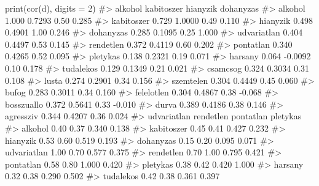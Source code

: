 \documentclass[
  letterpaper,
]{krantz}
\makeatletter
\newenvironment{Shaded}{\begin{snugshade}}{\end{snugshade}}
\newcommand{\AttributeTok}[1]{\textcolor[rgb]{0.40,0.45,0.13}{#1}}
\newcommand{\CommentTok}[1]{\textcolor[rgb]{0.37,0.37,0.37}{#1}}
\newcommand{\DecValTok}[1]{\textcolor[rgb]{0.68,0.00,0.00}{#1}}
\newcommand{\FunctionTok}[1]{\textcolor[rgb]{0.28,0.35,0.67}{#1}}
\newcommand{\NormalTok}[1]{\textcolor[rgb]{0.00,0.23,0.31}{#1}}
\newenvironment{kframe}{%
\medskip{}
\setlength{\fboxsep}{.8em}
 \def\at@end@of@kframe{}%
 \ifinner\ifhmode%
  \def\at@end@of@kframe{\end{minipage}}%
  \begin{minipage}{\columnwidth}%
 \fi\fi%
 \def\FrameCommand##1{\hskip\@totalleftmargin \hskip-\fboxsep
 \colorbox{shadecolor}{##1}\hskip-\fboxsep
     \hskip-\linewidth \hskip-\@totalleftmargin \hskip\columnwidth}%
 \MakeFramed {\advance\hsize-\width
   \@totalleftmargin\z@ \linewidth\hsize
   \@setminipage}}%
 {\par\unskip\endMakeFramed%
 \at@end@of@kframe}
\renewenvironment{Shaded}{\begin{kframe}}{\end{kframe}}
\makeatother
\begin{document}
\begin{Shaded}
\begin{Highlighting}[]
\FunctionTok{print}\NormalTok{(}\FunctionTok{cor}\NormalTok{(d), }\AttributeTok{digits =} \DecValTok{2}\NormalTok{)}
\CommentTok{\#\textgreater{}             alkohol kabitoszer hianyzik dohanyzas}
\CommentTok{\#\textgreater{} alkohol       1.000     0.7293     0.50     0.285}
\CommentTok{\#\textgreater{} kabitoszer    0.729     1.0000     0.49     0.110}
\CommentTok{\#\textgreater{} hianyzik      0.498     0.4901     1.00     0.246}
\CommentTok{\#\textgreater{} dohanyzas     0.285     0.1095     0.25     1.000}
\CommentTok{\#\textgreater{} udvariatlan   0.404     0.4497     0.53     0.145}
\CommentTok{\#\textgreater{} rendetlen     0.372     0.4119     0.60     0.202}
\CommentTok{\#\textgreater{} pontatlan     0.340     0.4265     0.52     0.095}
\CommentTok{\#\textgreater{} pletykas      0.138     0.2321     0.19     0.071}
\CommentTok{\#\textgreater{} harsany       0.064    {-}0.0092     0.10     0.178}
\CommentTok{\#\textgreater{} tudalekos     0.129     0.1349     0.21     0.021}
\CommentTok{\#\textgreater{} csamcsog      0.324     0.3034     0.31     0.108}
\CommentTok{\#\textgreater{} lusta         0.274     0.2901     0.34     0.156}
\CommentTok{\#\textgreater{} szemtelen     0.304     0.4449     0.45     0.060}
\CommentTok{\#\textgreater{} bufog         0.283     0.3011     0.34     0.160}
\CommentTok{\#\textgreater{} felelotlen    0.304     0.4867     0.38    {-}0.068}
\CommentTok{\#\textgreater{} bosszuallo    0.372     0.5641     0.33    {-}0.010}
\CommentTok{\#\textgreater{} durva         0.389     0.4186     0.38     0.146}
\CommentTok{\#\textgreater{} agressziv     0.344     0.4207     0.36     0.024}
\CommentTok{\#\textgreater{}             udvariatlan rendetlen pontatlan pletykas}
\CommentTok{\#\textgreater{} alkohol            0.40      0.37     0.340    0.138}
\CommentTok{\#\textgreater{} kabitoszer         0.45      0.41     0.427    0.232}
\CommentTok{\#\textgreater{} hianyzik           0.53      0.60     0.519    0.193}
\CommentTok{\#\textgreater{} dohanyzas          0.15      0.20     0.095    0.071}
\CommentTok{\#\textgreater{} udvariatlan        1.00      0.70     0.577    0.375}
\CommentTok{\#\textgreater{} rendetlen          0.70      1.00     0.795    0.421}
\CommentTok{\#\textgreater{} pontatlan          0.58      0.80     1.000    0.420}
\CommentTok{\#\textgreater{} pletykas           0.38      0.42     0.420    1.000}
\CommentTok{\#\textgreater{} harsany            0.32      0.38     0.290    0.502}
\CommentTok{\#\textgreater{} tudalekos          0.42      0.38     0.361    0.397}

\end{Highlighting}
\end{Shaded}
\end{document}
